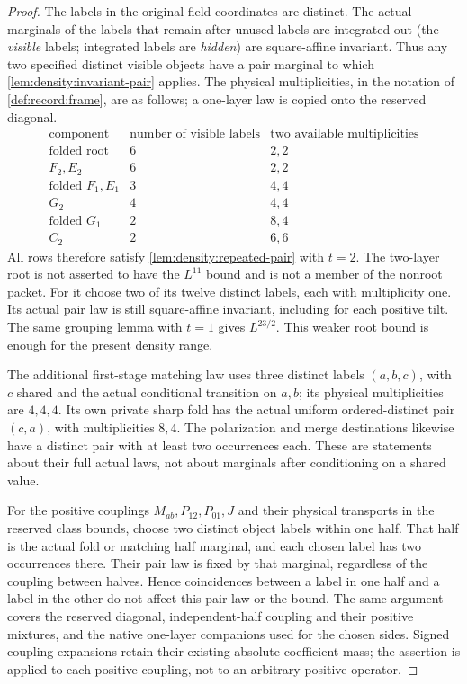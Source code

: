 \begin{proof}
The labels in the original field coordinates are distinct.
The actual marginals of the labels that remain after unused
labels are integrated out (the \emph{visible} labels; integrated
labels are \emph{hidden}) are square-affine invariant. Thus any
two specified distinct visible objects have
a pair marginal to which \cref{lem:density:invariant-pair} applies.
The physical multiplicities, in the notation of \cref{def:record:frame}, are as follows; a one-layer law is copied
onto the reserved diagonal.
\[
\begin{array}{c|c|c}
\text{component}&\text{number of visible labels}&
 \text{two available multiplicities}\\ \hline
\text{folded root}&6&2,2\\
F_2,E_2&6&2,2\\
\text{folded }F_1,E_1&3&4,4\\
G_2&4&4,4\\
\text{folded }G_1&2&8,4\\
C_2&2&6,6
\end{array}
\]
All rows therefore satisfy \cref{lem:density:repeated-pair} with $t=2$.
The two-layer root is not asserted to have the $L^{11}$ bound and is
not a member of the nonroot packet. For it choose two of its twelve
distinct labels, each with multiplicity one. Its actual pair law is
still square-affine invariant, including for each positive tilt.
The same grouping lemma with $t=1$ gives $L^{23/2}$. This weaker root
bound is enough for the present density range.

The additional first-stage matching law uses three distinct labels
$(a,b,c)$, with $c$ shared and the actual conditional transition on
$a,b$; its physical multiplicities are $4,4,4$. Its own private sharp
fold has the actual uniform ordered-distinct pair $(c,a)$, with
multiplicities $8,4$. The polarization and merge destinations likewise
have a distinct pair with at least two occurrences each. These are
statements about their full actual laws, not about marginals after
conditioning on a shared value.

For the positive couplings $M_{ab},P_{12},P_{01},J$ and their physical
transports in the reserved class bounds, choose two distinct object
labels within one half. That half is the actual fold or matching half
marginal, and each chosen label has two occurrences there. Their pair
law is fixed by that marginal, regardless of the coupling between
halves. Hence coincidences between a label in one half and a label in the other do not affect this pair law or the bound. The same
argument covers the reserved diagonal, independent-half coupling and
their positive mixtures, and the native one-layer companions used for
the chosen sides. Signed coupling expansions retain their existing
absolute coefficient mass; the assertion is applied to each positive
coupling, not to an arbitrary positive operator.


\end{proof}

